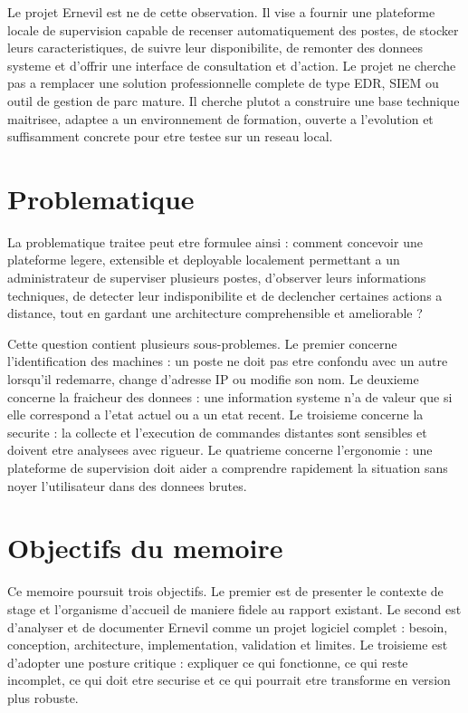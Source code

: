 \documentclass[12pt,a4paper]{report}
\begin{document}
Le projet Ernevil est ne de cette observation. Il vise a fournir une plateforme locale de supervision capable de recenser automatiquement des postes, de stocker leurs caracteristiques, de suivre leur disponibilite, de remonter des donnees systeme et d'offrir une interface de consultation et d'action. Le projet ne cherche pas a remplacer une solution professionnelle complete de type EDR, SIEM ou outil de gestion de parc mature. Il cherche plutot a construire une base technique maitrisee, adaptee a un environnement de formation, ouverte a l'evolution et suffisamment concrete pour etre testee sur un reseau local.

\section{Problematique}
La problematique traitee peut etre formulee ainsi : comment concevoir une plateforme legere, extensible et deployable localement permettant a un administrateur de superviser plusieurs postes, d'observer leurs informations techniques, de detecter leur indisponibilite et de declencher certaines actions a distance, tout en gardant une architecture comprehensible et ameliorable ?

Cette question contient plusieurs sous-problemes. Le premier concerne l'identification des machines : un poste ne doit pas etre confondu avec un autre lorsqu'il redemarre, change d'adresse IP ou modifie son nom. Le deuxieme concerne la fraicheur des donnees : une information systeme n'a de valeur que si elle correspond a l'etat actuel ou a un etat recent. Le troisieme concerne la securite : la collecte et l'execution de commandes distantes sont sensibles et doivent etre analysees avec rigueur. Le quatrieme concerne l'ergonomie : une plateforme de supervision doit aider a comprendre rapidement la situation sans noyer l'utilisateur dans des donnees brutes.

\section{Objectifs du memoire}
Ce memoire poursuit trois objectifs. Le premier est de presenter le contexte de stage et l'organisme d'accueil de maniere fidele au rapport existant. Le second est d'analyser et de documenter Ernevil comme un projet logiciel complet : besoin, conception, architecture, implementation, validation et limites. Le troisieme est d'adopter une posture critique : expliquer ce qui fonctionne, ce qui reste incomplet, ce qui doit etre securise et ce qui pourrait etre transforme en version plus robuste.
\end{document}
